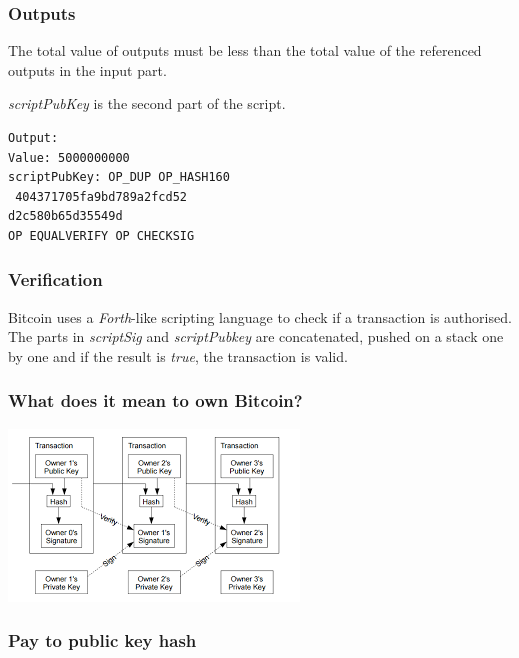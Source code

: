 \documentclass{beamer}
\begin{document}
\begin{frame}[fragile]
\frametitle{Outputs}
The total value of outputs must be less than the total value of the referenced outputs in the input part. 

\textit{scriptPubKey} is the second part of the script.
\begin{verbatim}
Output:
Value: 5000000000
scriptPubKey: OP_DUP OP_HASH160
 404371705fa9bd789a2fcd52
d2c580b65d35549d
OP EQUALVERIFY OP CHECKSIG
\end{verbatim}
\end{frame}

\begin{frame}
\frametitle{Verification}
Bitcoin uses a \textit{Forth}-like scripting language to check if a transaction is authorised. The parts in \textit{scriptSig} and \textit{scriptPubkey} are concatenated, pushed on a stack one by one and if the result is \textit{true}, the transaction is valid.
\end{frame}

\begin{frame}
\frametitle{What does it mean to own Bitcoin?}
\includegraphics[scale=0.8]{images/chain.png}

\end{frame}


\begin{frame}
\frametitle{Pay to public key hash}
\begin{center}
\end{center}
\end{frame}
\end{document}
